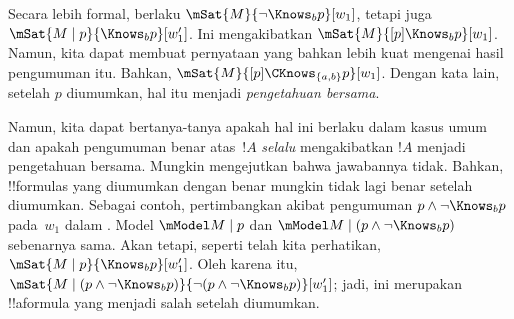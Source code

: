 \documentclass[../../../include/open-logic-section]{subfiles}
\begin{document}
Secara lebih formal, berlaku $\mSat{M}{\lnot\Knows_b p}[w_1]$, tetapi juga
$\mSat{M\mid p}{\Knows_b p}[w'_1]$. Ini mengakibatkan
$\mSat{M}{[p]\Knows_b p}[w_1]$. Namun, kita dapat membuat pernyataan yang
bahkan lebih kuat mengenai hasil pengumuman itu. Bahkan,
$\mSat{M}{[p]\CKnows_{\{a,b\}}p}[w_1]$. Dengan kata lain, setelah $p$
diumumkan, hal itu menjadi \emph{pengetahuan bersama}.

Namun, kita dapat bertanya-tanya apakah hal ini berlaku dalam kasus umum dan
apakah pengumuman benar atas~$!A$ \emph{selalu} mengakibatkan $!A$ menjadi
pengetahuan bersama. Mungkin mengejutkan bahwa jawabannya tidak. Bahkan,
!!{formula}s yang diumumkan dengan benar mungkin tidak lagi benar setelah
diumumkan. Sebagai contoh, pertimbangkan akibat pengumuman
$p\land\lnot\Knows_b p$ pada~$w_1$ dalam
. Model $\mModel M\mid p$ dan
$\mModel M\mid(p\land\lnot\Knows_b p)$ sebenarnya sama. Akan tetapi, seperti
telah kita perhatikan, $\mSat{M\mid p}{\Knows_b p}[w'_1]$. Oleh karena itu,
$\mSat{M\mid(p\land\lnot\Knows_b p)}{\lnot
(p\land\lnot\Knows_b p)}[w'_1]$; jadi, ini merupakan !!a{formula} yang
menjadi salah setelah diumumkan.
\end{document}
